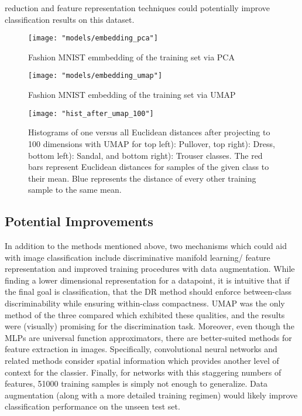 \documentclass[conference]{IEEEtran}
\begin{document}
reduction and feature representation techniques could potentially improve classification results on this dataset.

\begin{center}
	\begin{figure}[t]
		\centering
		\texttt{[image: "models/embedding\_pca"]}
		\caption{Fashion MNIST emmbedding of the training set via PCA}
		\label{fig:pca_embedding}
	\end{figure}
\end{center}

\begin{center}
	\begin{figure}[t]
		\centering
		\texttt{[image: "models/embedding\_umap"]}
		\caption{Fashion MNIST embedding of the training set via UMAP}
		\label{fig:umap_embedding}
	\end{figure}
\end{center}

 \begin{center}
	\begin{figure}[t]
		\centering
		\texttt{[image: "hist\_after\_umap\_100"]}
		\caption{Histograms of one versus all Euclidean distances after projecting to 100 dimensions with UMAP for top left): Pullover, top right): Dress, bottom left): Sandal, and bottom right): Trouser classes.  The red bars represent Euclidean distances for samples of the given class to their mean.  Blue represents the distance of every other training sample to the same mean.}
		\label{fig:hist_after_umap_100}
	\end{figure}
\end{center}

\subsection{Potential Improvements}
In addition to the methods mentioned above, two mechanisms which could aid with image classification include discriminative manifold learning/ feature representation and improved training procedures with data augmentation.  While finding a lower dimensional representation for a datapoint, it is intuitive that if the final goal is classification, that the DR method should enforce between-class discriminability while ensuring within-class compactness.  UMAP was the only method of the three compared which exhibited these qualities, and the results were (visually) promising for the discrimination task.  Moreover, even though the MLPs are universal function approximators, there are better-suited methods for feature extraction in images.  Specifically, convolutional neural networks and related methods consider spatial information which provides another level of context for the classier. Finally, for networks with this staggering numbers of features, 51000 training samples is simply not enough to generalize.  Data augmentation (along with a more detailed training regimen) would likely improve classification performance on the unseen test set.
\end{document}
